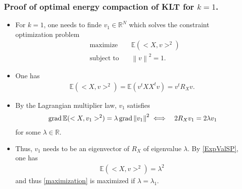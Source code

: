 \begin{frame}\frametitle{Proof of optimal energy compaction of KLT for $k=1$.}
\begin{itemize}
\item For $k=1$, one needs to finde $v_1\in\mathbb{R}^N$ which solves the constraint optimization problem 
\begin{align}\label{maximization}
 & \text{maximize}\quad &\mathbb{E}(<X,v>^2) \nonumber \\ & \text{subject to}\quad &\left\|v\right\|^2=1.
\end{align}
\item One has 
\begin{align}\label{ExpValSP}
\mathbb{E}(<X,v>^2)=\mathbb{E}(v^tXX^tv)
=v^tR_Xv.
\end{align}
\item By the Lagrangian multiplier law, $v_1$ satisfies  
\begin{align*}
&\operatorname{grad}\mathbb{E}(<X,v_1>^2) =\lambda \operatorname{grad}\left\|v_1\right\|^2 
\iff &2R_Xv_1=2\lambda v_1
\end{align*}
for some $\lambda\in\mathbb{R}$. 
\item Thus, $v_1$ needs to be an eigenvector of $R_X$ of eigenvalue $\lambda$. By \eqref{ExpValSP}, one 
has 
\begin{align*}
\mathbb{E}(<X,v>^2)=\lambda^2
\end{align*}
and thus \eqref{maximization} is maximized if $\lambda=\lambda_1$. 
\end{itemize}
\end{frame}

